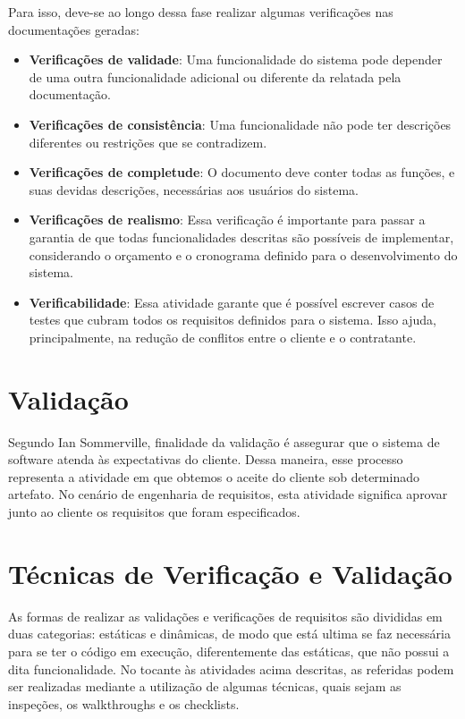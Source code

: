\documentclass[runningheads]{llncs}
\begin{document}
Para isso, deve-se ao longo dessa fase realizar algumas verificações nas documentações geradas:

\begin{itemize}
    \item \textbf{Verificações de validade}: Uma funcionalidade do sistema pode depender de uma outra funcionalidade adicional ou diferente da relatada pela documentação.
    \item \textbf{Verificações de consistência}: Uma funcionalidade não pode ter descrições diferentes ou restrições que se contradizem.
    \item\textbf{Verificações de completude}: O documento deve conter todas as funções, e suas devidas descrições, necessárias aos usuários do sistema.
    \item \textbf{Verificações de realismo}: Essa verificação é importante para passar a garantia de que todas funcionalidades descritas são possíveis de implementar, considerando o orçamento e o cronograma definido para o desenvolvimento do sistema.
    \item \textbf{Verificabilidade}: Essa atividade garante que é possível escrever casos de testes que cubram todos os requisitos definidos para o sistema. Isso ajuda, principalmente, na redução de conflitos entre o cliente e o contratante.
\end{itemize}

\section{Validação}
Segundo Ian Sommerville, finalidade da validação é assegurar que o sistema de software atenda às expectativas do cliente. Dessa maneira, esse processo representa a atividade em que obtemos o aceite do cliente sob determinado artefato. No cenário de engenharia de requisitos, esta atividade significa aprovar junto ao cliente os requisitos que foram especificados.

\section{Técnicas de Verificação e Validação}
As formas de realizar as validações e verificações de requisitos são divididas em duas categorias: estáticas e dinâmicas, de modo que está ultima se faz necessária para se ter o código em execução, diferentemente das estáticas, que não possui a dita funcionalidade. No tocante às atividades acima descritas, as referidas podem ser realizadas mediante a utilização de algumas técnicas, quais sejam as inspeções, os walkthroughs e os checklists.
\end{document}

